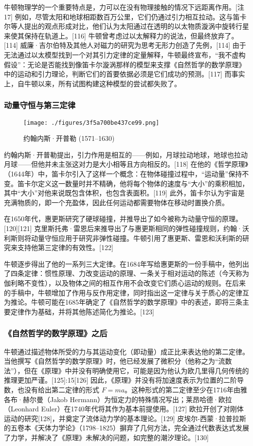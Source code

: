 牛顿物理学的一个重要特点是，力可以在没有物理接触的情况下远距离作用。[注17] 例如，尽管太阳和地球相距数百万公里，它们仍通过引力相互拉动。这与笛卡尔等人提出的观点形成对比，他们认为太阳通过在透明的以太物质漩涡中旋转行星来使其保持在轨道上。[116] 牛顿曾考虑过以太解释力的说法，但最终放弃了。[114] 威廉·吉尔伯特及其他人对磁力的研究为思考无形力创造了先例，[114] 由于无法通过以太模型找到一个对其引力定律的定量解释，牛顿最终宣布，“我不虚构假设”：无论是否能找到像笛卡尔漩涡那样的模型来支撑《自然哲学的数学原理》中的运动和引力理论，判断它们的首要依据必须是它们成功的预测。[117] 而事实上，自牛顿以来，所有试图构建这种模型的尝试都失败了。
\subsubsection{动量守恒与第三定律}
\begin{figure}[ht]
\centering
\texttt{[image: ./figures/3f5a700be437ce99.png]}
\caption{约翰内斯·开普勒 (1571–1630)} \label{fig_NEW01_22}
\end{figure}
约翰内斯·开普勒提出，引力作用是相互的——例如，月球拉动地球，地球也拉动月球——但他并未主张这对力是大小相等且方向相反的。[118] 在他的《哲学原理》（1644年）中，笛卡尔引入了这样一个概念：在物体碰撞过程中，“运动量”保持不变。笛卡尔定义这一数量时并不精确，他将每个物体的速度与“大小”的乘积相加，其中“大小”对他来说既包含体积，也包含表面积。[119] 此外，笛卡尔认为宇宙是充满物质的，即一个充盈体，因此任何运动都需要物体在移动时置换介质。

在1650年代，惠更斯研究了硬球碰撞，并推导出了如今被称为动量守恒的原理。[120][121] 克里斯托弗·雷恩后来推导出了与惠更斯相同的弹性碰撞规则，约翰·沃利斯则将动量守恒应用于研究非弹性碰撞。牛顿引用了惠更斯、雷恩和沃利斯的研究来支持他第三定律的有效性。[122]

牛顿逐步得出了他的一系列三大定律。在1684年写给惠更斯的一份手稿中，他列出了四条定律：惯性原理、力改变运动的原理、一条关于相对运动的陈述（今天称为伽利略不变性），以及物体之间的相互作用不会改变它们质心运动的规则。在后来的手稿中，牛顿增加了作用与反作用定律，同时指出这一定律与关于质心的定律互为推论。牛顿可能在1685年确定了《自然哲学的数学原理》中的表述，即将三条主要定律作为基础，并将其他陈述简化为推论。[123]
\subsubsection{《自然哲学的数学原理》之后}
牛顿通过描述物体所受的力与其运动变化（即动量）成正比来表达他的第二定律。当他撰写《自然哲学的数学原理》时，他已经发展了微积分（他称之为“流数法”），但在《原理》中并没有明确使用它，可能是因为他认为欧几里得几何传统的推理更加严谨。[125]:15[126] 因此，《原理》并没有将加速度表示为位置的二阶导数，也没有给出第二定律的形式 \( F = ma \)。这种形式的第二定律至少在1716年由雅各布·赫尔曼（Jakob Hermann）为恒定力的特殊情况写出；莱昂哈德·欧拉（Leonhard Euler）在1740年代将其作为基本前提使用。[127] 欧拉开创了对刚体运动的研究[128]，并奠定了流体动力学的基本理论。[129] 皮埃尔-西蒙·拉普拉斯的五卷本《天体力学论》（1798–1825）摒弃了几何方法，完全通过代数表达式发展了力学，并解决了《原理》未解决的问题，如完整的潮汐理论。[130]

